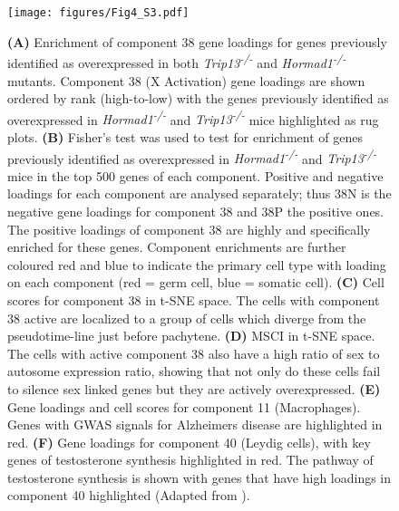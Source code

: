 \begin{figure}[H]
	\centering
	\texttt{[image: figures/Fig4\_S3.pdf]}
	\caption{
		\textbf{(A)} Enrichment of component 38 gene loadings for genes previously identified as overexpressed in both \textit{Trip13\textsuperscript{-/-}} and \textit{Hormad1\textsuperscript{-/-}} mutants. Component 38 (X Activation) gene loadings are shown ordered by rank (high-to-low) with the genes previously identified as overexpressed in \textit{Hormad1\textsuperscript{-/-}} and \textit{Trip13\textsuperscript{-/-}} mice highlighted as rug plots.
		\textbf{(B)} Fisher’s test was used to test for enrichment of genes previously identified as overexpressed in \textit{Hormad1\textsuperscript{-/-}} and \textit{Trip13\textsuperscript{-/-}} mice in the top 500 genes of each component. Positive and negative loadings for each component are analysed separately; thus 38N is the negative gene loadings for component 38 and 38P the positive ones. The positive loadings of component 38 are highly and specifically enriched for these genes. Component enrichments are further coloured red and blue to indicate the primary cell type with loading on each component (red = germ cell, blue = somatic cell). 
		\textbf{(C)} Cell scores for component 38 in t-SNE space. The cells with component 38 active are localized to a group of cells which diverge from the pseudotime-line just before pachytene.
		\textbf{(D)} MSCI in t-SNE space. The cells with active component 38 also have a high ratio of sex to autosome expression ratio, showing that not only do these cells fail to silence sex linked genes but they are actively overexpressed.
		\textbf{(E)} Gene loadings and cell scores for component 11 (Macrophages). Genes with GWAS signals for Alzheimers disease are highlighted in red. 
		\textbf{(F)} Gene loadings for component 40 (Leydig cells), with key genes of testosterone synthesis highlighted in red. The pathway of testosterone synthesis is shown with genes that have high loadings in component 40 highlighted (Adapted from \parencite{Stojkov2013Orally}).
	}
	\label{fig:MiscComponents}
\end{figure}

